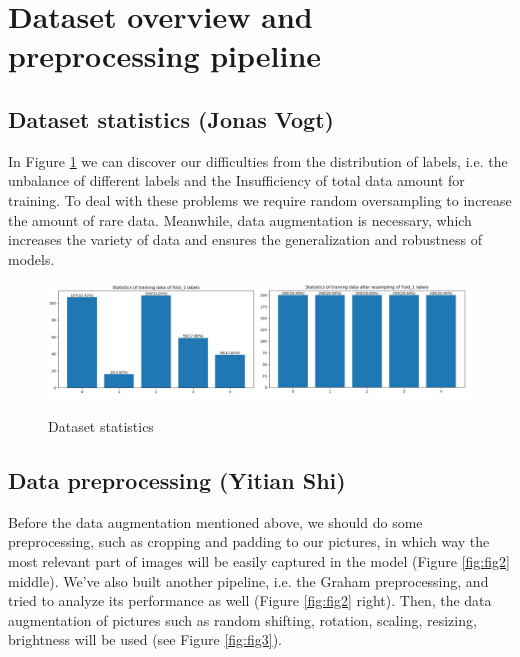 \documentclass{article}
\begin{document}
\section{Dataset overview and preprocessing pipeline}
\label{sec:dataset}

\subsection{Dataset statistics (Jonas Vogt)}
In Figure \ref{fig:fig1} we can discover our difficulties from the distribution of labels, i.e. the unbalance of different labels and the Insufficiency of total data amount for training. To deal with these problems we require random oversampling to increase the amount of rare data. Meanwhile, data augmentation is necessary, which increases the variety of data and ensures the generalization and robustness of models.
\begin{figure}
\centering
{
\includegraphics[scale=0.15]{../pictures/statistics/5-class-paper.png}
}
\caption{Dataset statistics}
\label{fig:fig1}
\end{figure}

\subsection{Data preprocessing (Yitian Shi)}
Before the data augmentation mentioned above, we should do some preprocessing, such as cropping and padding to our pictures, in which way the most relevant part of images will be easily captured in the model (Figure \ref{fig:fig2} middle). We've also built another pipeline, i.e. the Graham preprocessing, and tried to analyze its performance as well (Figure \ref{fig:fig2} right). Then, the data augmentation of pictures such as random shifting, rotation, scaling, resizing, brightness will be used (see Figure \ref{fig:fig3}).
\end{document}
